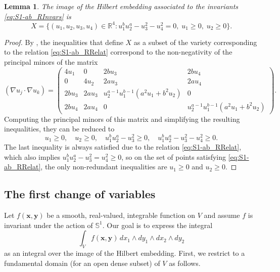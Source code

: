 \documentclass[twoside]{amsart}
\newtheorem{lemma}[theorem]{Lemma}
\theoremstyle{definition}
\theoremstyle{remark}
\numberwithin{equation}{section}
\newcommand{\Sp}{\mathbb{S}}
\newcommand{\R}{\mathbb{R}}
\begin{document}
\begin{lemma}
\label{lem:S1-ab_ImHilb}
The image of the Hilbert embedding associated to the invariants \eqref{eq:S1-ab_RInvars} is
\begin{equation}
\label{eq:S1-ab_ImHilb}
    X = \{
    (u_1, u_2, u_3, u_4)\in\R^4 :
    u_1^b u_2^a - u_3^2 - u_4^2 = 0,
    \;
    u_1 \geq 0,
    \;
    u_2 \geq 0
    \}.
\end{equation}
\end{lemma}
\begin{proof}
By \cite[Thrm~0.10 and Prop.~0.6]{ProcesiSchwarz}, the inequalities that define $X$ as a subset of the variety corresponding to the relation
\eqref{eq:S1-ab_RRelat} correspond to the non-negativity of the principal minors of the matrix
\[
    (\nabla u_j \cdot \nabla u_k)
    =
    \begin{pmatrix}
        4 u_1 & 0 & 2 b u_3 & 2 b u_4 \\
        0 & 4 u_2 & 2 a u_3 & 2 a u_4 \\
        2 b u_3 & 2 a u_3 & u_2^{a-1} u_1^{b-1}
        (a^2 u_1+b^2 u_2) & 0 \\
        2 b u_4 & 2 a u_4 & 0 & u_2^{a-1} u_1^{b-1} (a^2 u_1+b^2 u_2)
    \end{pmatrix}.
\]
Computing the principal minors of this matrix and simplifying the resulting inequalities, they can be reduced to
\[
    u_1 \geq 0,
    \quad
    u_2 \geq 0,
    \quad
    u_1^b u_2^a - u_3^2 \geq 0,
    \quad
    u_1^b u_2^a - u_3^2 - u_4^2 \geq 0.
\]
The last inequality is always satisfied due to the relation \eqref{eq:S1-ab_RRelat}, which also implies
$u_1^b u_2^a - u_3^2 = u_4^2 \geq 0$, so on the set of points satisfying \eqref{eq:S1-ab_RRelat}, the only non-redundant
inequalities are $u_1 \geq 0$ and $u_2 \geq 0$.
\end{proof}


\subsection{The first change of variables}
\label{subsec:S1-ab_COV1}


Let $f(\mathbf{x}, \mathbf{y})$ be a smooth, real-valued, integrable function on $V$ and assume $f$ is invariant under the action of $\Sp^1$. Our goal is to
express the integral
\begin{equation}
\label{eq:S1-ab_Int0}
    \int_V f(\mathbf{x}, \mathbf{y}) \, dx_1 \wedge dy_1 \wedge dx_2\wedge dy_2
\end{equation}
as an integral over the image of the Hilbert embedding. First, we restrict to a fundamental domain (for an open dense subset) of $V$ as follows.
\end{document}
